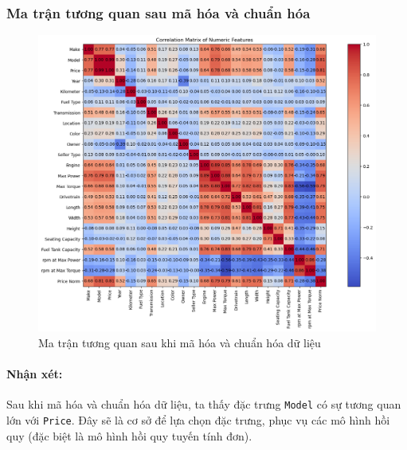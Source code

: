 \subsubsection{Ma trận tương quan sau mã hóa và chuẩn hóa}

\begin{figure}[H]
    \centering
    \includegraphics[width=1\linewidth]{img/corr-matrix-2.png}
    \caption{Ma trận tương quan sau khi mã hóa và chuẩn hóa dữ liệu}
    \label{fig:corr-matrix-2}
\end{figure}

\paragraph{Nhận xét:}{Sau khi mã hóa và chuẩn hóa dữ liệu, ta thấy đặc trưng \texttt{Model} có sự tương quan lớn với \texttt{Price}. Đây sẽ là cơ sở để lựa chọn đặc trưng, phục vụ các mô hình hồi quy (đặc biệt là mô hình hồi quy tuyến tính đơn).}

\pagebreak